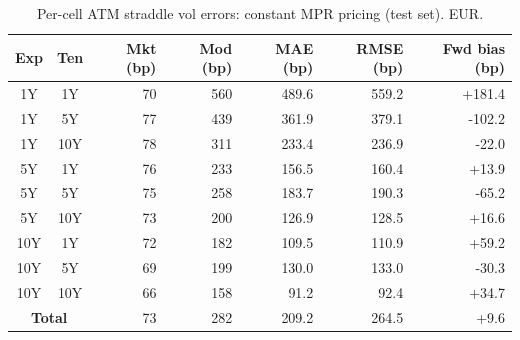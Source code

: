 \begin{table}[H]
\centering
\caption{Per-cell ATM straddle vol errors: constant MPR pricing (test set). EUR.}
\label{tab:constant_mpr_consistent_per_cell_test}
\small
\begin{tabular}{@{}ccrrrrr@{}}
\toprule
\textbf{Exp} & \textbf{Ten} & \textbf{Mkt (bp)} & \textbf{Mod (bp)} & \textbf{MAE (bp)} & \textbf{RMSE (bp)} & \textbf{Fwd bias (bp)} \\
\midrule
  1Y & 1Y & 70 & 560 & 489.6 & 559.2 & +181.4 \\
  1Y & 5Y & 77 & 439 & 361.9 & 379.1 & -102.2 \\
  1Y & 10Y & 78 & 311 & 233.4 & 236.9 & -22.0 \\
  \midrule
  5Y & 1Y & 76 & 233 & 156.5 & 160.4 & +13.9 \\
  5Y & 5Y & 75 & 258 & 183.7 & 190.3 & -65.2 \\
  5Y & 10Y & 73 & 200 & 126.9 & 128.5 & +16.6 \\
  \midrule
  10Y & 1Y & 72 & 182 & 109.5 & 110.9 & +59.2 \\
  10Y & 5Y & 69 & 199 & 130.0 & 133.0 & -30.3 \\
  10Y & 10Y & 66 & 158 & 91.2 & 92.4 & +34.7 \\
  \midrule
  \multicolumn{2}{c}{\textbf{Total}} & 73 & 282 & 209.2 & 264.5 & +9.6 \\
\bottomrule
\end{tabular}
\end{table}